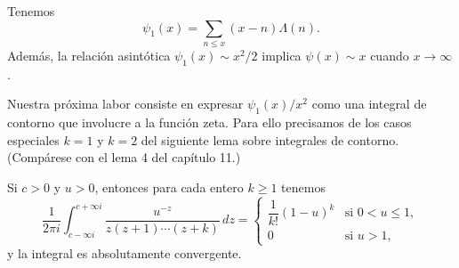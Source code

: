     \begin{teorema}\label{teo:13-1}
        Tenemos
        \begin{equation}\label{eq:13-10}
            \psi_1(x)=\sum_{n\leq x}(x-n)\Lambda(n).
        \end{equation}
        Además, la relación asintótica $\psi_1(x)\sim x^2/2$ implica $\psi(x)\sim x$ cuando
        $x\to\infty$.
    \end{teorema}

    Nuestra próxima labor consiste en expresar $\psi_1(x)/x^2$ como una integral de contorno
    que involucre a la función zeta. Para ello precisamos de los casos especiales $k=1$ y
    $k=2$ del siguiente lema sobre integrales de contorno. (Compárese con el lema 4 del
    capítulo 11.)

    \begin{lema}\label{lem:13-3}
        Si $c>0$ y $u>0$, entonces para cada entero $k\geq1$ tenemos
        \begin{equation*}
            \frac{1}{2\pi i}\int_{c-\infty i}^{c+\infty i}\frac{u^{-z}}{z(z+1)\cdots(z+k)}\,dz=
            \begin{cases}
                \dfrac{1}{k!}(1-u)^k&\text{si }0<u\leq1,\\[1.5ex]
                0&\text{si }u>1,
            \end{cases}
        \end{equation*}
        y la integral es absolutamente convergente.
    \end{lema}

